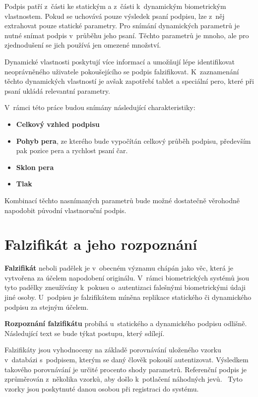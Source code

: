 Podpis patří z~části ke statickým a z~části k~dynamickým biometrickým vlastnostem.
Pokud se uchovává pouze výsledek psaní podpisu, lze z~něj extrahovat pouze statické parametry.
Pro snímání dynamických parametrů je nutné snímat podpis v~průběhu jeho psaní.
Těchto parametrů je mnoho, ale pro zjednodušení se jich používá jen omezené množství.

Dynamické vlastnosti poskytují více informací a umožňují lépe identifikovat neoprávněného uživatele pokoušejícího se podpis falzifikovat.    %
K~zaznamenání těchto dynamických vlastností je avšak zapotřebí tablet a speciální pero, které při psaní ukládá relevantní parametry.~\cite{DrahanskýMartin2011}  %
\newline

\noindent
V~rámci této práce budou snímány následující charakteristiky:
\begin{itemize}
  \item \textbf{Celkový vzhled podpisu}
  \item \textbf{Pohyb pera}, ze kterého bude vypočítán celkový průběh podpisu, především pak pozice pera a rychlost psaní čar. 
  \item \textbf{Sklon pera} 
  \item \textbf{Tlak}
\end{itemize}
Kombinací těchto nasnímaných parametrů bude možné dostatečně věrohodně napodobit původní vlastnoruční podpis. 

\section{Falzifikát a jeho rozpoznání}
\textbf{Falzifikát} neboli padělek je v~obecném významu chápán jako věc, která je vytvořena za účelem napodobení originálu. %
V~rámci biometrických systémů jsou tyto padělky zneužívány k~pokusu o~autentizaci falešnými biometrickými údaji jiné osoby. %
U~podpisu je falzifikátem míněna replikace statického či dynamického podpisu za stejným účelem.                             %
\newline

\noindent
\textbf{Rozpoznání falzifikátu} probíhá u~statického a dynamického podpisu odlišně. 
Následující text se bude týkat postupu, který sdílejí.

Falzifikáty jsou vyhodnoceny na základě porovnávání uloženého vzorku v~databázi s~podpisem, kterým se daný člověk pokouší autentizovat.
Výsledkem takového porovnávání je určité procento shody parametrů.
Referenční podpis je zprůměrován z~několika vzorků, aby došlo k~potlačení náhodných jevů.~\cite{VUT2009} %
Tyto vzorky jsou poskytnuté danou osobou při registraci do systému.

